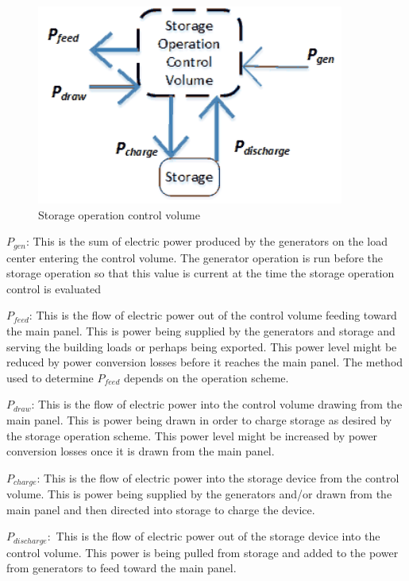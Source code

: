 \begin{figure}[hbtp] %
\centering
\includegraphics[width=0.9\textwidth, height=0.9\textheight, keepaspectratio=true]{media/StorageOperationControlVolume.png}
\caption{Storage operation control volume \protect \label{fig:storage-operation-control-volume}}
\end{figure}

${P_{gen}}$:  This is the sum of electric power produced by the generators on the load center entering the control volume.  The generator operation is run before the storage operation so that this value is current at the time the storage operation control is evaluated 

${P_{feed}}$:  This is the flow of electric power out of the control volume feeding toward the main panel.  This is power being supplied by the generators and storage and serving the building loads or perhaps being exported.  This power level might be reduced by power conversion losses before it reaches the main panel.  The method used to determine $ {P_{feed}}  $ depends on the operation scheme.
  
${P_{draw}}$:  This is the flow of electric power into the control volume drawing from the main panel.  This is power being drawn in order to charge storage as desired by the storage operation scheme.  This power level might be increased by power conversion losses once it is drawn from the main panel.  

${P_{charge}}$:  This is the flow of electric power into the storage device from the control volume.  This is power being supplied by the generators and/or drawn from the main panel and then directed into storage to charge the device.

${P_{discharge}}:$  This is the flow of electric power out of the storage device into the control volume.  This power is being pulled from storage and added to the power from generators to feed toward the main panel. 

